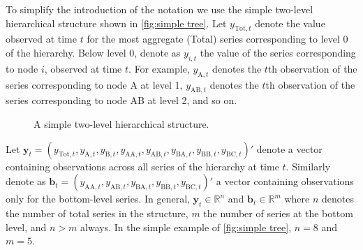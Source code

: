 \documentclass[a4paper, 11pt]{article}
\begin{document}
To simplify the introduction of the notation we use the simple two-level hierarchical structure shown in \autoref{fig:simple tree}. Let $y_{\text{Tot},t}$ denote the value observed at time $t$ for the most aggregate (Total) series corresponding to level 0 of the hierarchy. Below level 0, denote as $y_{i,t}$ the value of the series corresponding to node $i$, observed at time $t$. For example, $y_{\text{A},t}$ denotes the $t$th observation of the series corresponding to node A at level 1, $y_{\text{AB},t}$ denotes the $t$th observation of the series corresponding to node AB at level 2, and so on.

\begin{figure}[!hbt]\centering
	\caption{A simple two-level hierarchical structure.}
	\label{fig:simple tree}
\end{figure}

Let $\bm{y}_t = (y_{\text{Tot},t},y_{\text{A},t}, y_{\text{B},t},y_{\text{AA},t}, y_{\text{AB},t}, y_{\text{BA},t}, y_{\text{BB},t},y_{\text{BC},t})'$ denote a vector containing observations across all series of the hierarchy at time $t$. Similarly denote as $\bm{b}_t = (y_{\text{AA},t}, y_{\text{AB},t}, y_{\text{BA},t}, y_{\text{BB},t}, y_{\text{BC},t})'$ a vector containing observations only for the bottom-level series. In general, $\bm{y}_t\in \mathbb{R}^n$ and $\bm{b}_t \in \mathbb{R}^m$ where $n$ denotes the number of total series in the structure, $m$ the number of series at the bottom level, and $n>m$ always. In the simple example of \autoref{fig:simple tree}, $n=8$ and $m=5$.
\end{document}
